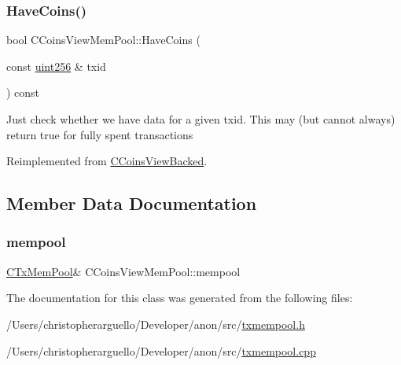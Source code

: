 \subsubsection{\texorpdfstring{Have\+Coins()}{HaveCoins()}}
{\footnotesize\ttfamily bool C\+Coins\+View\+Mem\+Pool\+::\+Have\+Coins (\begin{DoxyParamCaption}\item[{const \mbox{\hyperlink{classuint256}{uint256}} \&}]{txid }\end{DoxyParamCaption}) const\hspace{0.3cm}{\ttfamily [virtual]}}

Just check whether we have data for a given txid. This may (but cannot always) return true for fully spent transactions 

Reimplemented from \mbox{\hyperlink{class_c_coins_view_backed_ad49041658bdec807d556e080476e6543}{C\+Coins\+View\+Backed}}.



\subsection{Member Data Documentation}
\mbox{\label{class_c_coins_view_mem_pool_a7a3870fc65376cb311a0b3abb28fec10}} 
\subsubsection{\texorpdfstring{mempool}{mempool}}
{\footnotesize\ttfamily \mbox{\hyperlink{class_c_tx_mem_pool}{C\+Tx\+Mem\+Pool}}\& C\+Coins\+View\+Mem\+Pool\+::mempool\hspace{0.3cm}{\ttfamily [protected]}}



The documentation for this class was generated from the following files\+:\begin{DoxyCompactItemize}
\item 
/\+Users/christopherarguello/\+Developer/anon/src/\mbox{\hyperlink{txmempool_8h}{txmempool.\+h}}\item 
/\+Users/christopherarguello/\+Developer/anon/src/\mbox{\hyperlink{txmempool_8cpp}{txmempool.\+cpp}}\end{DoxyCompactItemize}
